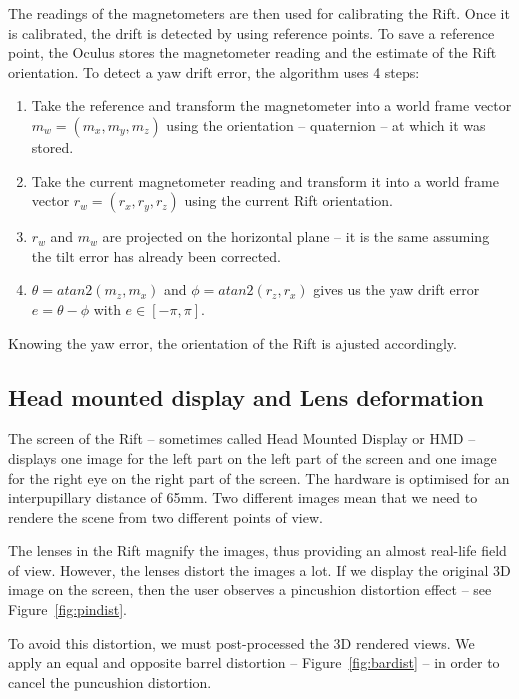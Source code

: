 \documentclass[12pt]{article}
\begin{document}
The readings of the magnetometers are then used for calibrating the Rift. Once it is calibrated, the drift is detected by using reference points. To save a reference point, the Oculus stores the magnetometer reading and the estimate of the Rift orientation. To detect a yaw drift error, the algorithm uses 4 steps:
\begin{enumerate}
\item Take the reference and transform the magnetometer into a world frame vector $m_w=(m_x,m_y,m_z)$ using the orientation -- quaternion -- at which it was stored.
\item Take the current magnetometer reading and transform it into a world frame vector $r_w=(r_x,r_y,r_z)$ using the current Rift orientation.
\item $r_w$ and $m_w$ are projected on the horizontal plane -- it is the same assuming the tilt error has already been corrected.
\item $\theta = atan2(m_z,m_x)$ and $\phi = atan2(r_z,r_x)$ gives us the yaw drift error $e = \theta - \phi$ with $e \in [-\pi,\pi]$.
\end{enumerate}

Knowing the yaw error, the orientation of the Rift is ajusted accordingly.

\subsection{Head mounted display and Lens deformation}
\label{subsec:lensdef}
The screen of the Rift -- sometimes called Head Mounted Display or HMD -- displays one image for the left part on the left part of the screen and one image for the right eye on the right part of the screen. The hardware is optimised for an interpupillary distance of 65mm. Two different images mean that we need to rendere the scene from two different points of view.

The lenses in the Rift magnify the images, thus providing an almost real-life field of view. However, the lenses distort the images a lot. If we display the original 3D image on the screen, then the user observes a pincushion distortion effect \cite{OVRDoc} -- see Figure~\ref{fig:pindist}.

To avoid this distortion, we must post-processed the 3D rendered views. We apply an equal and opposite barrel distortion -- Figure~\ref{fig:bardist} -- in order to cancel the puncushion distortion.
\end{document}

